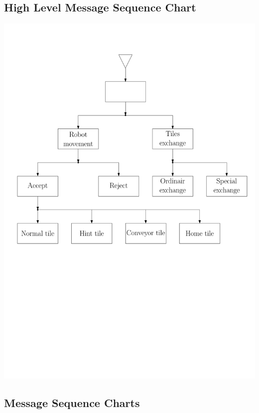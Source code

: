 \subsection{High Level Message Sequence Chart}
	\includegraphics[width=\linewidth]{MSC-files/HMSC.pdf}
	
\subsection{Message Sequence Charts}
